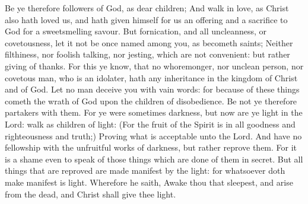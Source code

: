 Be ye therefore followers of God, as dear children; And walk in love, as Christ also hath loved us, and hath given himself for us an offering and a sacrifice to God for a sweetsmelling savour. But fornication, and all uncleanness, or covetousness, let it not be once named among you, as becometh saints; Neither filthiness, nor foolish talking, nor jesting, which are not convenient: but rather giving of thanks. For this ye know, that no whoremonger, nor unclean person, nor covetous man, who is an idolater, hath any inheritance in the kingdom of Christ and of God. Let no man deceive you with vain words: for because of these things cometh the wrath of God upon the children of disobedience. Be not ye therefore partakers with them. For ye were sometimes darkness, but now are ye light in the Lord: walk as children of light: (For the fruit of the Spirit is in all goodness and righteousness and truth;) Proving what is acceptable unto the Lord. And have no fellowship with the unfruitful works of darkness, but rather reprove them. For it is a shame even to speak of those things which are done of them in secret. But all things that are reproved are made manifest by the light: for whatsoever doth make manifest is light. Wherefore he saith, Awake thou that sleepest, and arise from the dead, and Christ shall give thee light.



\vspace{-0.5\baselineskip}

